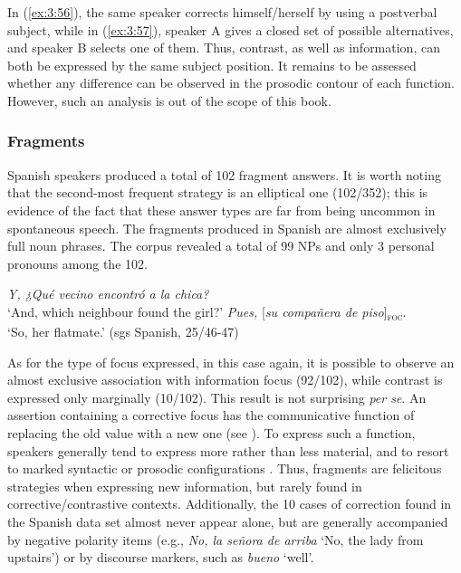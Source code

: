 In (\ref{ex:3:56}), the same speaker corrects himself/herself by using a postverbal subject, while in (\ref{ex:3:57}), speaker A gives a closed set of possible alternatives, and speaker B selects one of them. Thus, contrast, as well as information, can both be expressed by the same subject position. It remains to be assessed whether any difference can be observed in the prosodic contour of each function. However, such an analysis is out of the scope of this book. 


\subsubsection{Fragments}

Spanish speakers produced a total of 102 fragment answers. It is worth noting that the second-most frequent strategy is an elliptical one (102/352); this is evidence of the fact that these answer types are far from being uncommon in spontaneous speech.
The fragments produced in Spanish are almost exclusively full noun phrases. The corpus revealed a total of 99 NPs and only 3 personal pronouns among the 102.

 \ea \label{ex:3:58}
\ea \textit{Y, ¿Qué vecino encontró a la chica? }\\
 ‘And, which neighbour found the girl?'
\ex \textit{Pues,} {[\textit{su compañera de piso}]\textsubscript{\textsc{foc}}}\normalsize.\\
‘So, her flatmate.' \hfill (sgs Spanish, 25/46-47)   
\z \z 


As for the type of focus expressed, in this case again, it is possible to observe an almost exclusive association with information focus (92/102), while contrast is expressed only marginally (10/102). This result is not surprising \textit{per se}. An assertion containing a corrective focus has the communicative function of replacing the old value with a new one (see \cite{gussenhoven2008types}). To express such a function, speakers generally tend to express more rather than less material, and to resort to marked syntactic or prosodic configurations \parencite{zimmermann2008contrastive}. Thus, fragments are felicitous strategies when expressing new information, but rarely found in corrective/contrastive contexts. Additionally, the 10 cases of correction found in the Spanish data set almost never appear alone, but are generally accompanied by negative polarity items (e.g., \textit{No, la señora de arriba} `No, the lady from upstairs') or by discourse markers, such as \textit{bueno} `well'. \\


